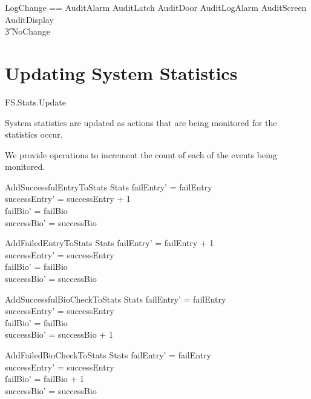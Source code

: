 \begin{zed}
        LogChange == AuditAlarm \lor AuditLatch \lor AuditDoor
        \lor AuditLogAlarm \lor AuditScreen \lor AuditDisplay 
\\ \t3 \lor NoChange
\end{zed}
\section{Updating System Statistics}

\begin{traceunit}{FS.Stats.Update}
\end{traceunit}

System statistics are updated as actions that are being monitored for
the statistics occur.

We provide operations to increment the count of each of the events
being monitored.

\begin{schema}{AddSuccessfulEntryToStats}
        \Delta Stats
\where
        failEntry' = failEntry 
\\      successEntry' = successEntry + 1
\\      failBio' = failBio
\\      successBio' = successBio 
\end{schema}

\begin{schema}{AddFailedEntryToStats}
        \Delta Stats
\where
        failEntry' = failEntry + 1
\\      successEntry' = successEntry
\\      failBio' = failBio
\\      successBio' = successBio 
\end{schema}

\begin{schema}{AddSuccessfulBioCheckToStats}
        \Delta Stats
\where
        failEntry' = failEntry 
\\      successEntry' = successEntry
\\      failBio' = failBio
\\      successBio' = successBio + 1
\end{schema}

\begin{schema}{AddFailedBioCheckToStats}
        \Delta Stats
\where
        failEntry' = failEntry 
\\      successEntry' = successEntry
\\      failBio' = failBio + 1
\\      successBio' = successBio
\end{schema}


